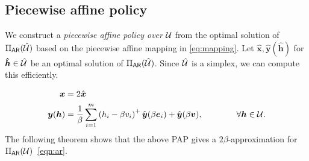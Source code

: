 \documentclass[11pt]{article}
\theoremstyle{plain}
\theoremstyle{definition}
\numberwithin{equation}{section}%
\numberwithin{equation}{section}%
\newcommand{\mb}[1]{\ensuremath{\boldsymbol{#1}}}
\begin{document}
\subsection{Piecewise affine policy }
We construct a \emph{piecewise affine policy over} ${\cal U}$ from the optimal solution of  $\Pi_{\sf AR}(\hat{\cal U})$ based on the piecewise affine mapping in \eqref{eq:mapping}. %
Let $\mb{\hat{x}}, \mb{\hat{y}(\hat{h})}$ for $\mb{\hat{h}} \in \hat{\cal U }$ be an optimal solution of $\Pi_{\sf AR}(\hat{\cal U})$. Since $\hat{\cal U}$ is a simplex, we can compute this efficiently.

\vspace{3mm}
\begin{equation} \label{picewise_sl}
\begin{split}
 \mb x  & =  2 \hat{\mb x}  \\
 \mb y( \mb h )  & = \frac{1}{\beta} \sum_{i=1}^m      \left( h_i -\beta v_i  \right)^+ \hat{\mb y }( \beta \mb e_i)+\hat{\mb y }(\beta \mb v), \qquad  \qquad \forall \mb h \in \cal U.
\end{split}
\end{equation}
The following theorem shows that the above PAP gives a $2\beta$-approximation for $\Pi_{\sf AR}({\cal U})$~\eqref{eqn:ar}.
\end{document}
